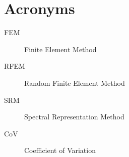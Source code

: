 
\chapter{Acronyms}
\begin{description}
\item[FEM] Finite Element Method
\item[RFEM] Random Finite Element Method
\item[SRM] Spectral Representation Method
\item[CoV] Coefficient of Variation


\end{description}

